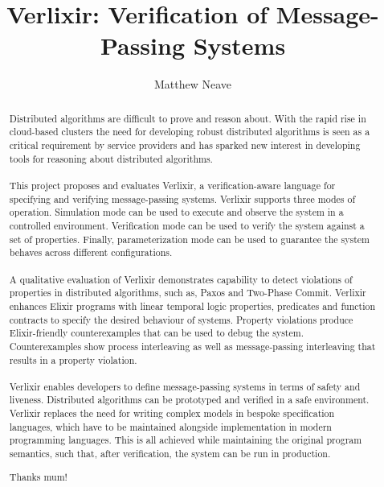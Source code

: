 \documentclass[a4paper, twoside]{report}
\title{Verlixir: Verification of Message-Passing Systems}
\author{Matthew Neave}
\begin{document}


\begin{abstract}
    Distributed algorithms are difficult to prove and reason about. With the rapid rise in cloud-based clusters the need for developing robust distributed algorithms is seen as a critical requirement by service providers and has sparked new interest in developing tools for reasoning about distributed algorithms.
    \\ \\
    This project proposes and evaluates Verlixir, a verification-aware language for specifying and verifying message-passing systems. Verlixir supports three modes of operation. Simulation mode can be used to execute and observe the system in a controlled environment. Verification mode can be used to verify the system against a set of properties. Finally, parameterization mode can be used to guarantee the system behaves across different configurations.
    \\ \\
    A qualitative evaluation of Verlixir demonstrates capability to detect violations of properties in distributed algorithms, such as, Paxos and Two-Phase Commit. Verlixir enhances Elixir programs with linear temporal logic properties, predicates and function contracts to specify the desired behaviour of systems. Property violations produce Elixir-friendly counterexamples that can be used to debug the system. Counterexamples show process interleaving as well as message-passing interleaving that results in a property violation.
    \\ \\
    Verlixir enables developers to define message-passing systems in terms of safety and liveness. Distributed algorithms can be prototyped and verified in a safe environment. Verlixir replaces the need for writing complex models in bespoke specification languages, which have to be maintained alongside implementation in modern programming languages. This is all achieved while maintaining the original program semantics, such that, after verification, the system can be run in production.
\end{abstract}
\renewcommand{\abstractname}{Acknowledgements}
\begin{abstract}
Thanks mum!
\end{abstract}

\tableofcontents
\listoffigures
\lstlistoflistings

% 







% 
% 



% 
% 
\end{document}
